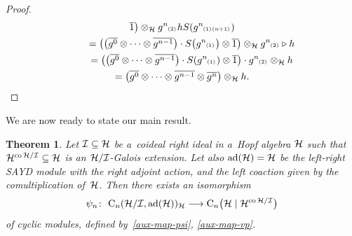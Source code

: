 \documentclass[pdftex]{sigma}
\numberwithin{equation}{section}
\newtheorem{Theorem}{Theorem}[section]
\DeclareMathOperator{\ad}{ad}
\DeclareMathOperator{\co}{co}
\newcommand{\ps}[1]{~\hspace{-4pt}_{^{(#1)}}}
\newcommand{\wbar}[1]{\overline{#1}}
\begin{document}
\begin{proof}
\begin{gather*}
\wbar{1}\big)\otimes_{\cal H} g^n\ps{2}hS(g^n\ps{1}\ps{n+1})
\\
\qquad
=\big(\big(\wbar{g^0} \otimes\cdots\otimes \wbar{g^{n-1}}\big)\cdot S\big(g^n\ps{1}\big)\otimes \wbar{1}\big)\otimes_{\cal H}
g^n\ps{2} \triangleright h
\\
\qquad
=\big(\big(\wbar{g^0} \otimes\cdots\otimes \wbar{g^{n-1}}\big)\cdot S(g^n\ps{1})\otimes \wbar{1}\big)\cdot g^n\ps{2}
\otimes_{\cal H} h
\\
\qquad
=\big(\wbar{g^0} \otimes\cdots\otimes \wbar{g^{n-1}}\otimes \wbar{g^n}\big) \otimes_{\cal H} h. \tag*{\qed}
\end{gather*}
\renewcommand{\qed}{}
\end{proof}

We are now ready to state our main result.
\begin{Theorem}
\label{dirpict}
Let ${\cal I}\subseteq {\cal H}$ be a~coideal right ideal in a~Hopf algebra ${\cal H}$
such that ${\cal H}^{\co{\cal H}/{\cal I}}\subseteq {\cal H}$ is an ${\cal H}/{\cal I}$-Galois extension.
Let also $\ad({\cal H})={\cal H}$ be the left-right SAYD module with the right adjoint action, and the left
coaction given by the comultiplication of~${\cal H}$.
Then there exists an isomorphism
\begin{gather*}
\psi_{n}\colon \  {\rm C}_{n}({\cal H}/{\cal I},\ad({\cal H}))_{{\cal H}}\longrightarrow {\rm C}_{n}\big({\cal H}\mid{\cal H}^{\co{\cal H}/{\cal I}}\big)
\end{gather*}
of cyclic modules, defined by~\eqref{aux-map-psi}, \eqref{aux-map-vp}.
\end{Theorem}
\end{document}
